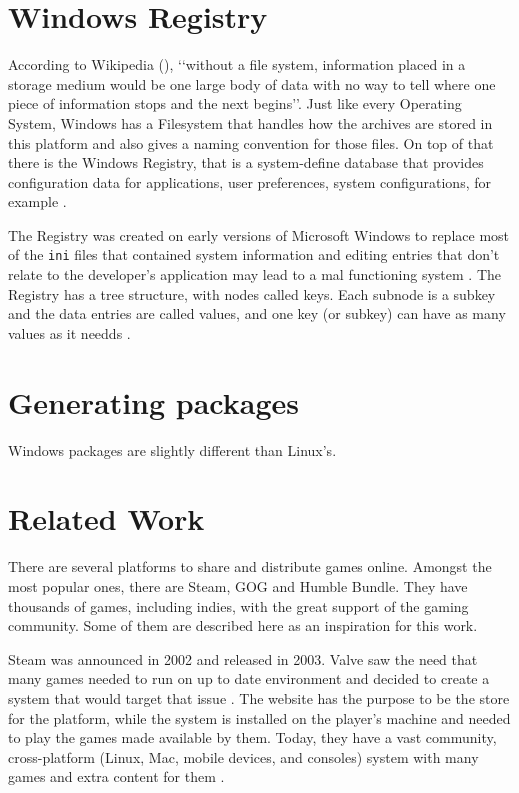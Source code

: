 \section{Windows Registry}
\label{sec:win_filesystem}

According to Wikipedia (\citeyear{wikipedia2017filesystem}), \lq\lq without a file system, information placed in a storage medium would be one large body of data with no way to tell where one piece of information stops and the next begins\rq\rq{}. Just like every Operating System, Windows has a Filesystem that handles how the archives are stored in this platform and also gives a naming convention for those files. On top of that there is the Windows Registry, that is a system-define database \cite{windowsregistry2017} that provides configuration data for applications, user preferences, system configurations, for example \cite{fisher_2017}.

The Registry was created on early versions of Microsoft Windows to replace most of the \texttt{ini} files that contained system information and editing entries that don't relate to the developer's application may lead to a mal functioning system \cite{microsoft2017registryinfo}. The Registry has a tree structure, with nodes called keys. Each subnode is a subkey and the data entries are called values, and one key (or subkey) can have as many values as it needds \cite{windows2017registrystructure}.


\section{Generating packages}
\label{sec:win_filesystem}

Windows packages are slightly different than Linux's.


\section{Related Work}
\label {sec:relate_work}

There are several platforms to share and distribute games online. Amongst the most popular ones, there are Steam, GOG and Humble Bundle. They have thousands of games, including indies, with the great support of the gaming community. Some of them are described here as an inspiration for this work.

Steam was announced in 2002 and released in 2003. Valve saw the need that many games needed to run on up to date environment and decided to create a system that would target that issue \cite{wikipedia2017steam}. The website has the purpose to be the store for the platform, while the system is installed on the player's machine and needed to play the games made available by them. Today, they have a vast community, cross-platform (Linux, Mac, mobile devices, and consoles) system with many games and extra content for them \cite{steam2017}.

